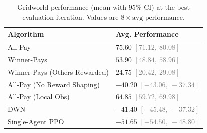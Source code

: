 \begin{table}
  \centering
  \caption{Gridworld performance (mean with 95\% CI) at the best evaluation iteration. Values are $8 \times \text{avg performance}$.}
  \begin{tabular}{ll}
    \hline
    {\bf Algorithm} & {\bf Avg. Performance} \\
    \hline
    All-Pay & $75.60$ {\small\textcolor{gray}{$[71.12,\ 80.08]$}} \\
    Winner-Pays & $53.90$ {\small\textcolor{gray}{$[48.84,\ 58.96]$}} \\
    Winner-Pays (Others Rewarded) & $24.75$ {\small\textcolor{gray}{$[20.42,\ 29.08]$}} \\
    All-Pay (No Reward Shaping) & $-40.20$ {\small\textcolor{gray}{$[-43.06,\ -37.34]$}} \\
    All-Pay (Local Obs) & $64.85$ {\small\textcolor{gray}{$[59.72,\ 69.98]$}} \\
    DWN & $-41.40$ {\small\textcolor{gray}{$[-45.48,\ -37.32]$}} \\
    Single-Agent PPO & $-51.65$ {\small\textcolor{gray}{$[-54.50,\ -48.80]$}} \\
    \hline
  \end{tabular}
  \label{tab:gridworld_all_methods}
\end{table}
